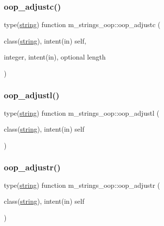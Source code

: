 \subsubsection{\texorpdfstring{oop\+\_\+adjustc()}{oop\_adjustc()}}
{\footnotesize\ttfamily type(\mbox{\hyperlink{structm__strings__oop_1_1string}{string}}) function m\+\_\+strings\+\_\+oop\+::oop\+\_\+adjustc (\begin{DoxyParamCaption}\item[{class(\mbox{\hyperlink{structm__strings__oop_1_1string}{string}}), intent(in)}]{self,  }\item[{integer, intent(in), optional}]{length }\end{DoxyParamCaption})\hspace{0.3cm}{\ttfamily [private]}}

\mbox{\label{namespacem__strings__oop_a8e2457b4a1c4489e9600e340fa9ce533}} 
\subsubsection{\texorpdfstring{oop\+\_\+adjustl()}{oop\_adjustl()}}
{\footnotesize\ttfamily type(\mbox{\hyperlink{structm__strings__oop_1_1string}{string}}) function m\+\_\+strings\+\_\+oop\+::oop\+\_\+adjustl (\begin{DoxyParamCaption}\item[{class(\mbox{\hyperlink{structm__strings__oop_1_1string}{string}}), intent(in)}]{self }\end{DoxyParamCaption})\hspace{0.3cm}{\ttfamily [private]}}

\mbox{\label{namespacem__strings__oop_abb0dfa5646259e4fc768700eada111ac}} 
\subsubsection{\texorpdfstring{oop\+\_\+adjustr()}{oop\_adjustr()}}
{\footnotesize\ttfamily type(\mbox{\hyperlink{structm__strings__oop_1_1string}{string}}) function m\+\_\+strings\+\_\+oop\+::oop\+\_\+adjustr (\begin{DoxyParamCaption}\item[{class(\mbox{\hyperlink{structm__strings__oop_1_1string}{string}}), intent(in)}]{self }\end{DoxyParamCaption})\hspace{0.3cm}{\ttfamily [private]}}

